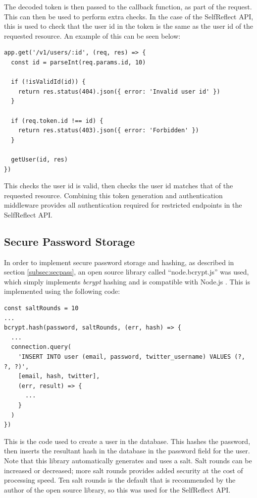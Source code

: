 \documentclass[11pt,openright,a4paper]{report}
\begin{document}
The decoded token is then passed to the callback function, as part of the request. This can then be used to perform extra checks. In the case of the SelfReflect API, this is used to check that the user id in the token is the same as the user id of the requested resource. An example of this can be seen below:
\begin{lstlisting}
app.get('/v1/users/:id', (req, res) => {
  const id = parseInt(req.params.id, 10)

  if (!isValidId(id)) {
    return res.status(404).json({ error: 'Invalid user id' })
  }

  if (req.token.id !== id) {
    return res.status(403).json({ error: 'Forbidden' })
  }

  getUser(id, res)
})
\end{lstlisting}

This checks the user id is valid, then checks the user id matches that of the requested resource. Combining this token generation and authentication middleware provides all authentication required for restricted endpoints in the SelfReflect API.

\subsection{Secure Password Storage}
In order to implement secure password storage and hashing, as described in section \ref{subsec:secpass}, an open source library called \enquote{node.bcrypt.js} was used, which simply implements \emph{bcrypt} hashing and is compatible with Node.js \parencite{nodebcrypt}. This is implemented using the following code:
\begin{lstlisting}
const saltRounds = 10
...
bcrypt.hash(password, saltRounds, (err, hash) => {
  ...
  connection.query(
    'INSERT INTO user (email, password, twitter_username) VALUES (?, ?, ?)',
    [email, hash, twitter],
    (err, result) => {
      ...
    }
  )
})
\end{lstlisting}
This is the code used to create a user in the database. This hashes the password, then inserts the resultant hash in the database in the password field for the user. Note that this library automatically generates and uses a salt. Salt rounds can be increased or decreased; more salt rounds provides added security at the cost of processing speed. Ten salt rounds is the default that is recommended by the author of the open source library, so this was used for the SelfReflect API.
\end{document}

